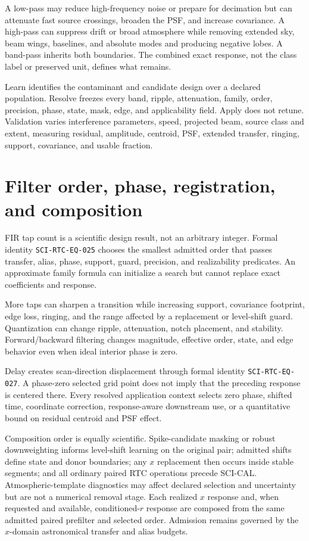 \documentclass[10pt]{article}
\begin{document}
A low-pass may reduce high-frequency noise or prepare for decimation but can
attenuate fast source crossings, broaden the PSF, and increase covariance.  A
high-pass can suppress drift or broad atmosphere while removing extended sky,
beam wings, baselines, and absolute modes and producing negative lobes.  A
band-pass inherits both boundaries.  The combined exact response, not the
class label or preserved unit, defines what remains.

Learn identifies the contaminant and candidate design over a declared
population.  Resolve freezes every band, ripple, attenuation, family, order,
precision, phase, state, mask, edge, and applicability field.  Apply does not
retune.  Validation varies interference parameters, speed, projected beam,
source class and extent, measuring residual, amplitude, centroid, PSF,
extended transfer, ringing, support, covariance, and usable fraction.

\section{Filter order, phase, registration, and composition}
\label{sec:rat-order-phase}
FIR tap count is a scientific design result, not an arbitrary integer.
Formal identity \texttt{SCI-RTC-EQ-025} chooses the smallest admitted order
that passes transfer, alias, phase, support, guard, precision, and
realizability predicates.  An approximate family formula can initialize a
search but cannot replace exact coefficients and response.

More taps can sharpen a transition while increasing support, covariance
footprint, edge loss, ringing, and the range affected by a replacement or
level-shift guard.  Quantization can change ripple, attenuation, notch
placement, and stability.  Forward/backward filtering changes magnitude,
effective order, state, and edge behavior even when ideal interior phase is
zero.

Delay creates scan-direction displacement through
formal identity \texttt{SCI-RTC-EQ-027}.  A phase-zero selected grid point does
not imply that the preceding response is centered there.  Every resolved application context selects
zero phase, shifted time, coordinate correction, response-aware downstream
use, or a quantitative bound on residual centroid and PSF effect.

Composition order is equally scientific.  Spike-candidate masking or robust
downweighting informs level-shift learning on the original pair; admitted
shifts define state and donor boundaries; any $x$ replacement then occurs
inside stable segments; and all ordinary paired RTC operations precede
SCI-CAL.  Atmospheric-template diagnostics may affect declared selection and
uncertainty but are not a numerical removal stage.  Each realized $x$ response
and, when requested and available, conditioned-$r$ response are composed from
the same admitted paired prefilter and selected order.  Admission remains
governed by the $x$-domain astronomical transfer and alias budgets.
\end{document}
